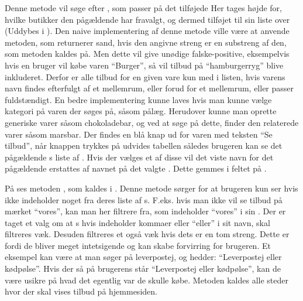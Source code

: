 Denne metode vil søge efter , som passer på det tilføjede 
Her tages højde for, hvilke butikker den pågældende  har fravalgt, og dermed tilføjet til sin liste over  (Uddybes i ).
Den naive implementering af denne metode ville være at anvende  metoden, som returnerer sand, hvis den angivne streng er en substreng af den, som metoden kaldes på. 
Men dette vil give unødige falske-positive, eksempelvis hvis en bruger vil købe varen ``Burger'', så vil tilbud på ``hamburgerryg'' blive inkluderet.
Derfor er alle tilbud for en given vare kun med i listen, hvis varens navn findes efterfulgt af et mellemrum, eller forud for et mellemrum, eller passer fuldstændigt.
En bedre implementering kunne laves hvis man kunne vælge kategori på varen der søges på, såsom pålæg.
Herudover kunne man oprette generiske varer såsom chokoladebar, og ved at søge på dette, finder den relaterede varer såsom marsbar.
Der findes en blå knap ud for varen med teksten ``Se tilbud'', når knappen trykkes på udvides tabellen således brugeren kan se det pågældende s liste af .
Hvis der vælges et af disse  vil det viste navn for det pågældende  erstattes af navnet på det valgte .
Dette gemmes i feltet  på .

På  ses metoden , som kaldes i . Denne metode sørger for at brugeren kun ser  hvis  ikke indeholder noget fra deres liste af s.
F.eks. hvis man ikke vil se tilbud på mærket ``vores'', kan man her filtrere  fra, som indeholder ``vores'' i sin . 
Der er taget et valg om at s hvis  indeholder kommaer eller ``eller'' i sit navn, skal filtreres væk.
Desuden filtreres et  også væk hvis dets  er en tom streng.
Dette er fordi de bliver meget intetsigende og kan skabe forvirring for brugeren. 
Et eksempel kan være at man søger på leverpostej, og  hedder: ``Leverpostej eller kødpølse''. 
Hvis der så på brugerens   står ``Leverpostej eller kødpølse'', kan de være usikre på hvad det egentlig var de skulle købe. 
Metoden kaldes alle steder hvor der skal vises tilbud på hjemmesiden.

